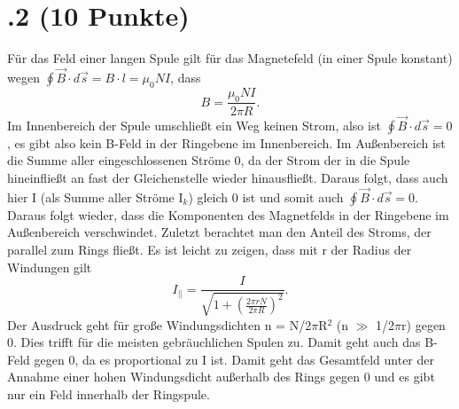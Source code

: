 \section*{\nr.2 \tittwo (10 Punkte)}
Für das Feld einer langen Spule gilt für das Magnetefeld (in einer Spule konstant) wegen $\oint \vec{B}\cdot d\vec{s} = B\cdot l = \mu_{0}NI$, dass 
\begin{equation}
	B = \frac{\mu_{0}NI}{2\pi R}.
\end{equation}
Im Innenbereich der Spule umschließt ein Weg keinen Strom, also ist $\oint \vec{B}\cdot d\vec{s} = 0$, es gibt also kein B-Feld in der Ringebene im Innenbereich. Im Außenbereich ist die Summe aller eingeschlossenen Ströme 0, da der Strom der in die Spule hineinfließt an fast der Gleichenstelle wieder hinausfließt. Daraus folgt, dass auch hier I (als Summe aller Ströme I$_k$) gleich 0 ist und somit auch $\oint \vec{B}\cdot d\vec{s} = 0$. Daraus folgt wieder, dass die Komponenten des Magnetfelds in der Ringebene im Außenbereich verschwindet.
Zuletzt berachtet man den Anteil des Stroms, der parallel zum Rings fließt. Es ist leicht zu zeigen, dass mit r der Radius der Windungen gilt 
\begin{equation}
	I_{||} = \frac{I}{\sqrt{1+\left(\frac{2 \pi r N}{2\pi R}\right)^2}}.
\end{equation}
Der Ausdruck geht für große Windungsdichten n = N/2$\pi$R$^2$ (n  $\gg$ 1/2$\pi$r) gegen 0. Dies trifft für die meisten gebräuchlichen Spulen zu. Damit geht auch das B-Feld gegen 0, da es proportional zu I ist. Damit geht das Gesamtfeld unter der Annahme einer hohen Windungsdicht außerhalb des Rings gegen 0 und es gibt nur ein Feld innerhalb der Ringspule.
